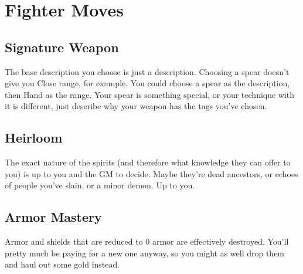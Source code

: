 \chapter{Fighter Moves}
   
 
\section{Signature Weapon}    
 

The base description you choose is just a description. Choosing a spear doesn't give you Close range, for example. You could choose a spear as the description, then Hand as the range. Your spear is something special, or your technique with it is different, just describe why your weapon has the tags you've chosen.

 
\section{Heirloom}   
 

The exact nature of the spirits (and therefore what knowledge they can offer to you) is up to you and the GM to decide. Maybe they're dead ancestors, or echoes of people you've slain, or a minor demon. Up to you.

 
\section{Armor Mastery}    
 

Armor and shields that are reduced to 0 armor are effectively destroyed. You'll pretty much be paying for a new one anyway, so you might as well drop them and haul out some gold instead.

 
